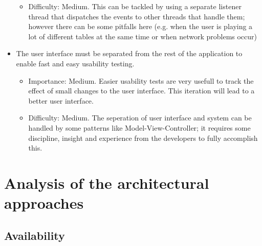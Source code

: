 \documentclass[a4paper,11pt]{report}
\begin{document}
\begin{itemize}
\begin{itemize}
\item Difficulty: Medium. This can be tackled by using a separate listener thread that dispatches the events
to other threads that handle them; however there can be some pitfalls here (e.g. when the user is playing 
a lot of different tables at the same time or when network problems occur)
\end{itemize}
\item The user interface must be separated from the rest of the application to enable fast and easy 
usability testing.
\begin{itemize}
\item Importance: Medium. Easier usability tests are very usefull to track the effect of small changes to
the user interface. This iteration will lead to a better user interface.
\item Difficulty: Medium. The seperation of user interface and system can be handled by some patterns like
Model-View-Controller; it requires some discipline, insight and experience from the developers to fully
accomplish this.
\end{itemize}
\end{itemize}

\section{Analysis of the architectural approaches}

\subsection{Availability}
\end{document}
